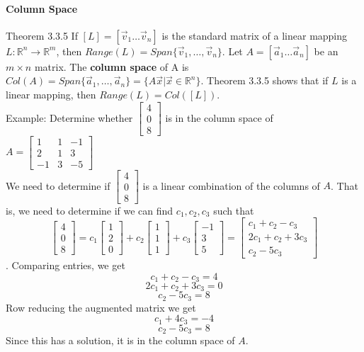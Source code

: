 \documentclass[10pt,letter]{article}
\begin{document}
\paragraph{Column Space} Theorem 3.3.5 If $[L]=[\vec{v}_1\ldots\vec{v}_n]$ is the standard matrix of a linear mapping $L:\mathbb{R}^n\rightarrow\mathbb{R}^m$, then $Range(L)=Span\{\vec{v}_1,\ldots,\vec{v}_n\}$. Let $A=[\vec{a}_1\ldots\vec{a}_n]$ be an $m\times n$ matrix. The \textbf{column space} of A is $Col(A)=Span\{\vec{a}_1,\ldots,\vec{a}_n\}=\{A\vec{x}|\vec{x}\in\mathbb{R}^n\}$. Theorem 3.3.5 shows that if $L$ is a linear mapping, then $Range(L)=Col([L])$. \\ 
Example: Determine whether $\begin{bmatrix}4\\0\\8\end{bmatrix}$ is in the column space of $A = \begin{bmatrix}1&1&-1\\2&1&3\\-1&3&-5\end{bmatrix}$ \\ 
We need to determine if $\begin{bmatrix}4\\0\\8\end{bmatrix}$ is a linear combination of the columns of $A$. That is, we need to determine if we can find $c_1,c_2,c_3$ such that $$\begin{bmatrix}4\\0\\8\end{bmatrix}=c_1\begin{bmatrix}1\\2\\0\end{bmatrix}+c_2\begin{bmatrix}1\\1\\1\end{bmatrix}+c_3\begin{bmatrix}-1\\3\\5\end{bmatrix}= \begin{bmatrix}c_1+c_2-c_3\\2c_1+c_2+3c_3\\c_2-5c_3\end{bmatrix}$$. Comparing entries, we get $$c_1+c_2-c_3=4$$ $$2c_1+c_2+3c_3=0$$ $$c_2-5c_3=8$$ Row reducing the augmented matrix we get $$c_1+4c_3=-4$$ $$c_2-5c_3=8$$ Since this has a solution, it is in the column space of $A$. \\ 
\end{document}
